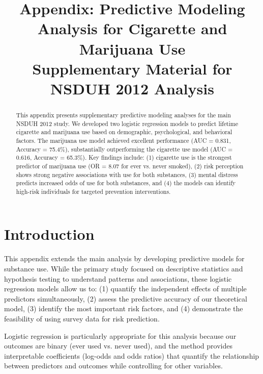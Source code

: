 \documentclass[conference]{IEEEtran}
\begin{document}
\title{Appendix: Predictive Modeling Analysis for Cigarette and Marijuana Use\\
\large Supplementary Material for NSDUH 2012 Analysis}

\author{
}

\maketitle

\begin{abstract}
This appendix presents supplementary predictive modeling analyses for the main NSDUH 2012 study. We developed two logistic regression models to predict lifetime cigarette and marijuana use based on demographic, psychological, and behavioral factors. The marijuana use model achieved excellent performance (AUC = 0.831, Accuracy = 75.4\%), substantially outperforming the cigarette use model (AUC = 0.616, Accuracy = 65.3\%). Key findings include: (1) cigarette use is the strongest predictor of marijuana use (OR = 8.07 for ever vs. never smoked), (2) risk perception shows strong negative associations with use for both substances, (3) mental distress predicts increased odds of use for both substances, and (4) the models can identify high-risk individuals for targeted prevention interventions.
\end{abstract}

\section{Introduction}

This appendix extends the main analysis by developing predictive models for substance use. While the primary study focused on descriptive statistics and hypothesis testing to understand patterns and associations, these logistic regression models allow us to: (1) quantify the independent effects of multiple predictors simultaneously, (2) assess the predictive accuracy of our theoretical model, (3) identify the most important risk factors, and (4) demonstrate the feasibility of using survey data for risk prediction.

Logistic regression is particularly appropriate for this analysis because our outcomes are binary (ever used vs. never used), and the method provides interpretable coefficients (log-odds and odds ratios) that quantify the relationship between predictors and outcomes while controlling for other variables.
\end{document}
